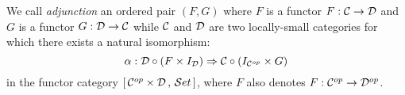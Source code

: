 \begin{defin}
    We call {\em adjunction} an ordered pair $(F,G)$ where $F$ is a functor
    $F:{\cal C}\to{\cal D}$ and $G$ is a functor $G:{\cal D}\to{\cal C}$
    while ${\cal C}$ and ${\cal D}$ are two locally-small categories for
    which there exists a natural isomorphism: 
        \[
            \alpha:{\cal D}\circ(F\times I_{\cal D})
            \Rightarrow{\cal C}\circ(I_{{\cal C}^{op}}\times G)
        \]
    in the functor category $[\,{\cal C}^{op}\times{\cal D}\, ,\, {\cal S}et\,]$,
    where $F$ also denotes $F:{\cal C}^{op}\rightarrow{\cal D}^{op}$.
\end{defin}
